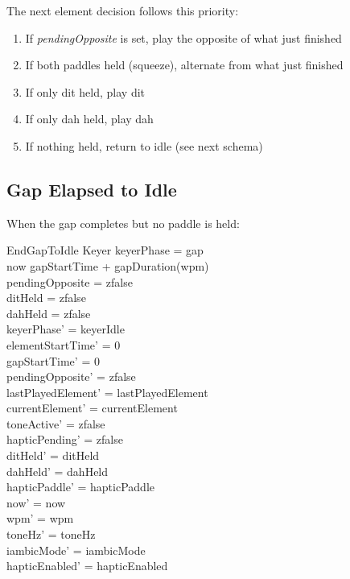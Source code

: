 \documentclass[a4paper,10pt,fleqn]{article}
\begin{document}
The next element decision follows this priority:

\begin{enumerate}
\item If \emph{pendingOpposite} is set, play the opposite of what just finished
\item If both paddles held (squeeze), alternate from what just finished
\item If only dit held, play dit
\item If only dah held, play dah
\item If nothing held, return to idle (see next schema)
\end{enumerate}

\subsection{Gap Elapsed to Idle}

When the gap completes but no paddle is held:

\begin{schema}{EndGapToIdle}
\Delta Keyer
\where
keyerPhase = gap \\
now \geq gapStartTime + gapDuration(wpm) \\
pendingOpposite = zfalse \\
ditHeld = zfalse \\
dahHeld = zfalse \\
keyerPhase' = keyerIdle \\
elementStartTime' = 0 \\
gapStartTime' = 0 \\
pendingOpposite' = zfalse \\
lastPlayedElement' = lastPlayedElement \\
currentElement' = currentElement \\
toneActive' = zfalse \\
hapticPending' = zfalse \\
ditHeld' = ditHeld \\
dahHeld' = dahHeld \\
hapticPaddle' = hapticPaddle \\
now' = now \\
wpm' = wpm \\
toneHz' = toneHz \\
iambicMode' = iambicMode \\
hapticEnabled' = hapticEnabled
\end{schema}
\end{document}
